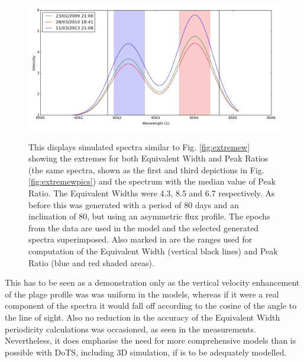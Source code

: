 \begin{figure}[!htbp]
\begin{center}
\includegraphics[scale=0.40]{Figures/extremeasym.png} \\
\end{center}
\caption{This displays simulated spectra similar to Fig. \ref{fig:extremew} showing the extremes for both Equivalent
  Width and Peak Ratios (the same spectra, shown as the first and third depictions in Fig. \ref{fig:extremewpics}) and
  the spectrum with the median value of Peak Ratio. The Equivalent Widths were 4.3, 8.5 and 6.7 respectively. As before
  this was generated with a period of 80 days and an inclination of 80\degree, but using an asymmetric flux profile. The
  epochs from the {\harps} data are used in the model and the selected generated spectra superimposed. Also marked in
  are the ranges used for computation of the Equivalent Width (vertical black lines) and Peak Ratio (blue and red shaded
  areas).}
\protect\label{fig:extremeasym}
\end{figure}

This has to be seen as a demonstration only as the vertical velocity enhancement of the plage profile was was uniform in
the models, whereas if it were a real component of the spectra it would fall off according to the cosine of the angle to
the line of sight. Also no reduction in the accuracy of the Equivalent Width periodicity calculations was occasioned,
as seen in the {\harps} measurements. Nevertheless, it does emphasise the need for more comprehensive models than is
possible with DoTS, including 3D simulation, if {\prox} is to be adequately modelled.
